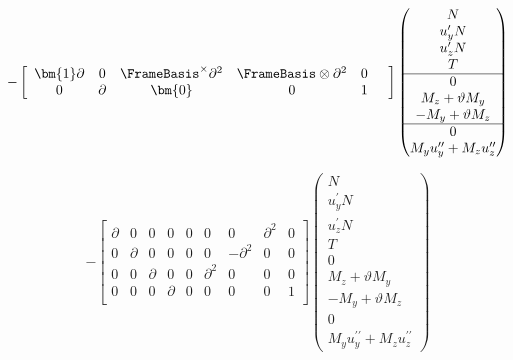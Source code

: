 $$
-\left[\begin{array}{cccccc}
\bm{1}\partial & 0 & \FrameBasis^\times \partial^2 & \FrameBasis \otimes\partial^2 & 0 & \\
0 & \partial &  \bm{0}  & 0 & 1
\end{array}\right]
\begin{pmatrix}
N \\
u_y^{\prime} N \\ %
u_z^{\prime} N \\ %
T \\ \hline
0 \\
 M_z+\vartheta M_y \\ %
-M_y+\vartheta M_z \\ \hline %
0 \\
M_y u_y^{\prime\prime} + M_z u_z^{\prime\prime}
\end{pmatrix}
$$

$$
-\left[\begin{array}{ccc|c|ccc|cc}
\partial & 0 & 0 & 0 & 0 & 0 & 0 & \partial^2 & 0 \\
0 & \partial & 0    & 0 & 0 & 0 & -\partial^2 & 0 & 0 \\
0 & 0 & \partial    & 0 & 0 & \partial^2 & 0 & 0 & 0 \\ \hline
0 & 0 & 0            & \partial & 0 & 0 & 0 & 0 & 1 \\
\end{array}\right]
\begin{pmatrix}
N \\
u_y^{\prime} N \\ %
u_z^{\prime} N \\ %
T \\
0 \\
 M_z+\vartheta M_y \\ %
-M_y+\vartheta M_z \\ %
0 \\
M_y u_y^{\prime\prime} + M_z u_z^{\prime\prime}
\end{pmatrix}
$$

